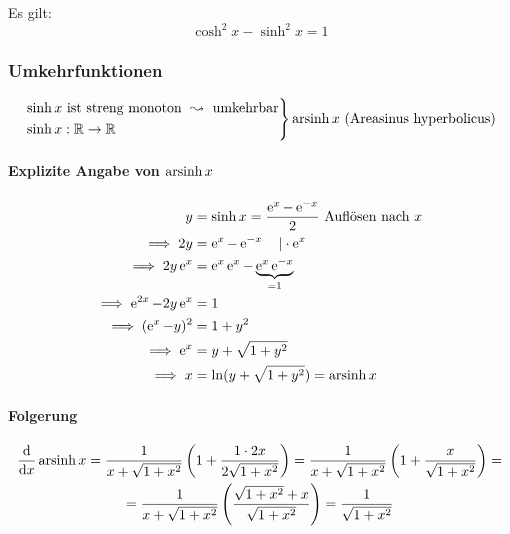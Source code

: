 
Es gilt:
\begin{equation*}
	\cosh^2 x - \sinh^2 x = 1
\end{equation*}

\subsubsection*{Umkehrfunktionen}

\begin{equation*}
	\left.
	\begin{aligned}
		&\sinh x \text{ ist streng monoton } \leadsto \text{ umkehrbar} \\
		&\sinh x : \mathbb{R} \rightarrow \mathbb{R}
	\end{aligned}
	\right\} \operatorname{arsinh} x \text{ (Areasinus hyperbolicus)}
\end{equation*}

\paragraph{Explizite Angabe von $\operatorname{arsinh} x$}
\begin{align*}
	y &= \sinh x = \frac{\operatorname{e}^x - \operatorname{e}^{-x}}{2} \text{ Auflösen nach $x$}\\
	\implies 2y &= \operatorname{e}^x - \operatorname{e}^{-x} \quad| \cdot \operatorname{e}^x \\
	\implies 2y \operatorname{e}^x &= \operatorname{e}^x \operatorname{e}^x - \underbrace{\operatorname{e}^x \operatorname{e}^{-x}}_{=1} \\
	\implies \operatorname{e}^{2x} - 2y\operatorname{e}^x &= 1 \\
	\implies (\operatorname{e}^x - y)^2 &= 1 + y^2 \\
	\implies \operatorname{e}^x &= y + \sqrt{1 + y^2} \\
	\implies x &= \ln (y + \sqrt{1 + y^2}) = \operatorname{arsinh} x
\end{align*}

\paragraph{Folgerung}
\begin{multline*}
	\frac{\mathrm d}{\mathrm d x} \operatorname{arsinh} x = \frac{1}{x + \sqrt{1 + x^2}}\left(1 + \frac{1 \cdot 2x}{2\sqrt{1 + x^2}}\right) = \frac{1}{x + \sqrt{1 + x^2}} \left(1 + \frac{x}{\sqrt{1 + x^2}} \right) = \\
	= \frac{1}{x + \sqrt{1 + x^2}} \left(\frac{\sqrt{1 + x^2} + x}{\sqrt{1 + x^2}}\right) = \frac{1}{\sqrt{1 + x^2}}
\end{multline*}


